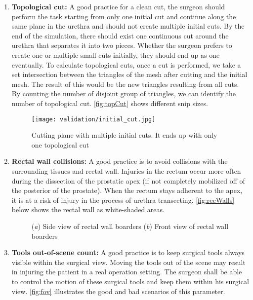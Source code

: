 \begin{enumerate}[start=1,label={Para \#\arabic*, }]
	\item \textbf{Topological cut:} A good practice for a clean cut, the surgeon should perform the task starting from only one initial cut and continue along the same plane in the urethra and should not create multiple initial cuts. By the end of the simulation, there should exist one continuous cut around the urethra that separates it into two pieces. Whether the surgeon prefers to create one or multiple small cuts initially, they should end up as one eventually. To calculate topological cuts, once a cut is performed, we take a set intersection between the triangles of the mesh after cutting and the initial mesh. The result of this would be the new triangles resulting from all cuts. By counting the number of disjoint group of triangles, we can identify the number of topological cut. \autoref{fig:topCut} shows different snip sizes.

  \begin{figure}
    \centering
    \texttt{[image: validation/initial\_cut.jpg]}
    \caption{Cutting plane with multiple initial cuts. It ends up with only one topological cut}\label{fig:topCut}
  \end{figure}

	\item \textbf{Rectal wall collisions:} A good practice is to avoid collisions with the surrounding tissues and rectal wall. Injuries in the rectum occur more often during the dissection of the prostatic apex (if not completely mobilized off of the posterior of the prostate). When the rectum stays adherent to the apex, it is at a risk of injury in the process of urethra transecting. \autoref{fig:recWalls} below shows the rectal wall as white-shaded areas.

  \begin{figure}
    \centering
    \qquad
    \caption{(\emph{a}) Side view of rectal wall boarders (\emph{b}) Front view of rectal wall boarders}\label{fig:recWalls}
  \end{figure}

	\item \textbf{Tools out-of-scene count:} A good practice is to keep surgical tools always visible within the surgical view. Moving the tools out of the scene may result in injuring the patient in a real operation setting. The surgeon shall be able to control the motion of these surgical tools and keep them within his surgical view. \autoref{fig:fov} illustrates the good and bad scenarios of this parameter.


\end{enumerate}
